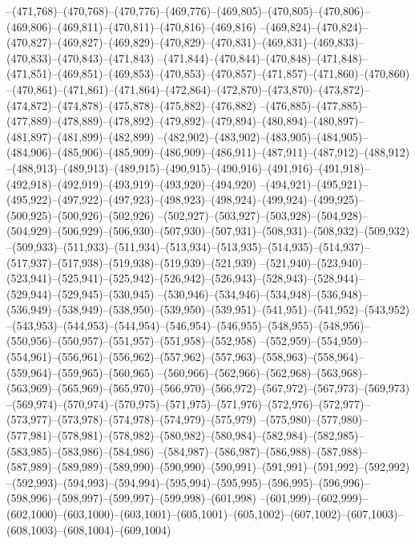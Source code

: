 --(471,768)--(470,768)--(470,776)--(469,776)--(469,805)--(470,805)--(470,806)--(469,806)--(469,811)--(470,811)--(470,816)--(469,816)
--(469,824)--(470,824)--(470,827)--(469,827)--(469,829)--(470,829)--(470,831)--(469,831)--(469,833)--(470,833)--(470,843)--(471,843)
--(471,844)--(470,844)--(470,848)--(471,848)--(471,851)--(469,851)--(469,853)--(470,853)--(470,857)--(471,857)--(471,860)--(470,860)
--(470,861)--(471,861)--(471,864)--(472,864)--(472,870)--(473,870)--(473,872)--(474,872)--(474,878)--(475,878)--(475,882)--(476,882)
--(476,885)--(477,885)--(477,889)--(478,889)--(478,892)--(479,892)--(479,894)--(480,894)--(480,897)--(481,897)--(481,899)--(482,899)
--(482,902)--(483,902)--(483,905)--(484,905)--(484,906)--(485,906)--(485,909)--(486,909)--(486,911)--(487,911)--(487,912)--(488,912)
--(488,913)--(489,913)--(489,915)--(490,915)--(490,916)--(491,916)--(491,918)--(492,918)--(492,919)--(493,919)--(493,920)--(494,920)
--(494,921)--(495,921)--(495,922)--(497,922)--(497,923)--(498,923)--(498,924)--(499,924)--(499,925)--(500,925)--(500,926)--(502,926)
--(502,927)--(503,927)--(503,928)--(504,928)--(504,929)--(506,929)--(506,930)--(507,930)--(507,931)--(508,931)--(508,932)--(509,932)
--(509,933)--(511,933)--(511,934)--(513,934)--(513,935)--(514,935)--(514,937)--(517,937)--(517,938)--(519,938)--(519,939)--(521,939)
--(521,940)--(523,940)--(523,941)--(525,941)--(525,942)--(526,942)--(526,943)--(528,943)--(528,944)--(529,944)--(529,945)--(530,945)
--(530,946)--(534,946)--(534,948)--(536,948)--(536,949)--(538,949)--(538,950)--(539,950)--(539,951)--(541,951)--(541,952)--(543,952)
--(543,953)--(544,953)--(544,954)--(546,954)--(546,955)--(548,955)--(548,956)--(550,956)--(550,957)--(551,957)--(551,958)--(552,958)
--(552,959)--(554,959)--(554,961)--(556,961)--(556,962)--(557,962)--(557,963)--(558,963)--(558,964)--(559,964)--(559,965)--(560,965)
--(560,966)--(562,966)--(562,968)--(563,968)--(563,969)--(565,969)--(565,970)--(566,970)--(566,972)--(567,972)--(567,973)--(569,973)
--(569,974)--(570,974)--(570,975)--(571,975)--(571,976)--(572,976)--(572,977)--(573,977)--(573,978)--(574,978)--(574,979)--(575,979)
--(575,980)--(577,980)--(577,981)--(578,981)--(578,982)--(580,982)--(580,984)--(582,984)--(582,985)--(583,985)--(583,986)--(584,986)
--(584,987)--(586,987)--(586,988)--(587,988)--(587,989)--(589,989)--(589,990)--(590,990)--(590,991)--(591,991)--(591,992)--(592,992)
--(592,993)--(594,993)--(594,994)--(595,994)--(595,995)--(596,995)--(596,996)--(598,996)--(598,997)--(599,997)--(599,998)--(601,998)
--(601,999)--(602,999)--(602,1000)--(603,1000)--(603,1001)--(605,1001)--(605,1002)--(607,1002)--(607,1003)--(608,1003)--(608,1004)--(609,1004)
